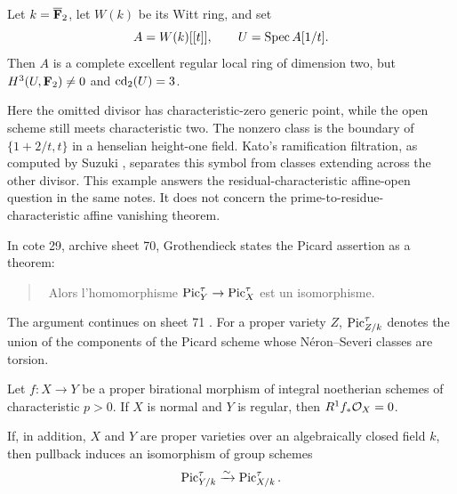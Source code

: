 \begin{theorem}\label{thm:wild}
Let $k=\overline{\mathbf F}_2$, let $W(k)$ be its Witt ring, and set
\[
 A=W(k)[[t]],\qquad U=\operatorname{Spec} A[1/t].
\]
Then $A$ is a complete excellent regular local ring of dimension two,
but $H^3(U,\mathbf F_2)\ne0$ and $\operatorname{cd}_2(U)=3$.
\end{theorem}

Here the omitted divisor has characteristic-zero generic point, while
the open scheme still meets characteristic two. The nonzero class is
the boundary of $\{1+2/t,t\}$ in a henselian height-one field. Kato's
ramification filtration, as computed by Suzuki
\cite[Propositions 6.1.2, 8.2.1 and 8.2.3]{Suzuki}, separates this
symbol from classes extending across the other divisor. This example
answers the residual-characteristic affine-open question in the same
notes. It does not concern the prime-to-residue-characteristic affine
vanishing theorem.

In cote 29, archive sheet 70, Grothendieck states the Picard assertion
as a theorem:
\begin{quote}
\guillemotleft\ Alors l'homomorphisme $\operatorname{Pic}^\tau_Y\to\operatorname{Pic}^\tau_X$
est un isomorphisme\guillemotright.
\end{quote}
The argument continues on sheet 71 \cite[sheets 70--71]{Grothendieck29}.
For a proper
variety $Z$, $\operatorname{Pic}^\tau_{Z/k}$ denotes the union of the components of
the Picard scheme whose N\'eron--Severi classes are torsion.

\begin{theorem}\label{thm:birational}
Let $f:X\to Y$ be a proper birational morphism of integral noetherian
schemes of characteristic $p>0$. If $X$ is normal and $Y$ is regular,
then $R^1f_*\mathcal O_X=0$.

If, in addition, $X$ and $Y$ are proper varieties over an algebraically
closed field $k$, then pullback induces an isomorphism of group schemes
\[
 \operatorname{Pic}^\tau_{Y/k}\xrightarrow{\sim}\operatorname{Pic}^\tau_{X/k}.
\]
\end{theorem}

